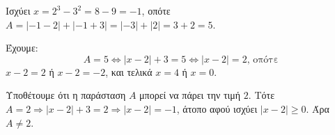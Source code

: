 
\begin{alist}
\item
\begin{rlist}
\item Ισχύει $x = 2^3 - 3^2 = 8 - 9 = -1$, οπότε $A = |-1 - 2| + |-1 + 3| = |-3| + |2| = 3 + 2 = 5$.

\item Έχουμε:
\[A = 5 \Leftrightarrow |x - 2| + 3 = 5 \Leftrightarrow |x - 2| = 2\text{, οπότε}\]
$x - 2 = 2$ ή $x - 2 = -2$, και τελικά
$x = 4$ ή $x = 0$.
\end{rlist}

\item Υποθέτουμε ότι η παράσταση $A$ μπορεί να πάρει την τιμή $2$.
Τότε $A = 2 \Rightarrow |x - 2| + 3 = 2 \Rightarrow |x - 2| = -1$, άτοπο αφού ισχύει $|x - 2| \ge 0$. Άρα $A \ne 2$.
\end{alist}

